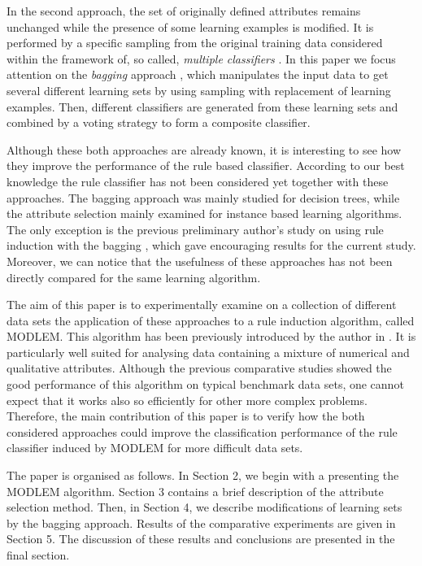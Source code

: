 \documentclass{elsart}
\begin{document}
In the second approach, the set of originally defined attributes remains
unchanged while the presence of some learning examples is modified. It is
performed by a specific sampling from the original training data considered
within the framework of, so called, \emph{multiple classifiers}
\cite{Gama,valenti}. In this paper we focus attention on the {\em bagging}
approach \cite{Bre}, which manipulates the input data to get several
different learning sets by using sampling with replacement of learning
examples. Then, different classifiers are generated from these learning sets
and combined by a voting strategy to form a composite classifier.

Although these both approaches are already known, it is interesting to see
how they improve the performance of the rule based classifier.  According to
our best knowledge the rule classifier has not been considered yet together
with these approaches. The bagging approach was mainly studied for decision
trees, while the attribute selection mainly examined for instance based
learning algorithms. The only exception is the previous preliminary author's
study on using rule induction with the bagging \cite{Ste02}, which gave
encouraging results for the current study. Moreover, we can notice that the
usefulness of these approaches has not been directly compared for the same
learning algorithm.


The aim of this paper is to experimentally examine on  a collection of
different data sets the application of these approaches to a rule induction
algorithm, called MODLEM. This algorithm has been previously introduced by
the author in \cite{modlem}. It is particularly well suited for analysing
data containing a mixture of numerical and qualitative attributes. Although
the previous comparative studies \cite{Grecy,GrzymStef,Stef01hab} showed the
good performance of this algorithm on typical benchmark data sets, one
cannot expect that it works also so efficiently for other more complex
problems. Therefore, the main contribution of this paper is to verify how
the both considered approaches could improve the classification performance
of the rule classifier induced by MODLEM for more difficult data sets.

The paper is organised as follows. In Section 2, we begin with a presenting
the MODLEM algorithm. Section 3 contains a brief description of the
attribute selection method.  Then, in Section 4, we describe modifications
of learning sets by the bagging approach. Results of the comparative
experiments are given in Section 5. The discussion of these results and
conclusions are presented in the final section.
\end{document}
